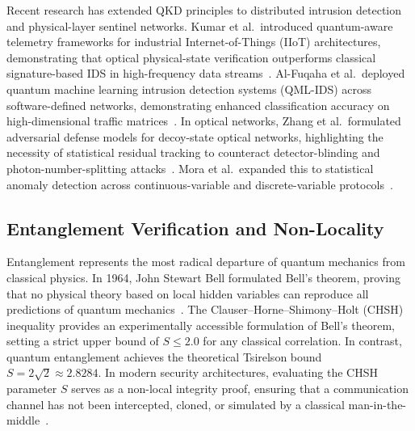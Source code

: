 \documentclass[journal,10pt]{IEEEtran}
\begin{document}
Recent research has extended QKD principles to distributed intrusion detection and physical-layer sentinel networks. Kumar et al.\ introduced quantum-aware telemetry frameworks for industrial Internet-of-Things (IIoT) architectures, demonstrating that optical physical-state verification outperforms classical signature-based IDS in high-frequency data streams~\cite{kumar2024quantum}. Al-Fuqaha et al.\ deployed quantum machine learning intrusion detection systems (QML-IDS) across software-defined networks, demonstrating enhanced classification accuracy on high-dimensional traffic matrices~\cite{alfuqaha2024qml}. In optical networks, Zhang et al.\ formulated adversarial defense models for decoy-state optical networks, highlighting the necessity of statistical residual tracking to counteract detector-blinding and photon-number-splitting attacks~\cite{zhang2024physical}. Mora et al.\ expanded this to statistical anomaly detection across continuous-variable and discrete-variable protocols~\cite{mora2024qkd}.

\subsection{Entanglement Verification and Non-Locality}
Entanglement represents the most radical departure of quantum mechanics from classical physics. In 1964, John Stewart Bell formulated Bell's theorem, proving that no physical theory based on local hidden variables can reproduce all predictions of quantum mechanics~\cite{chen2024entanglement}. The Clauser--Horne--Shimony--Holt (CHSH) inequality provides an experimentally accessible formulation of Bell's theorem, setting a strict upper bound of $S \le 2.0$ for any classical correlation. In contrast, quantum entanglement achieves the theoretical Tsirelson bound $S = 2\sqrt{2} \approx 2.8284$. In modern security architectures, evaluating the CHSH parameter $S$ serves as a non-local integrity proof, ensuring that a communication channel has not been intercepted, cloned, or simulated by a classical man-in-the-middle~\cite{chen2024entanglement}.
\end{document}
